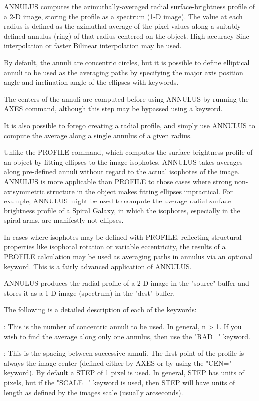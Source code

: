 ANNULUS computes the azimuthally-averaged radial surface-brightness profile
of a 2-D image, storing the profile as a spectrum (1-D image).  The value
at each radius is defined as the azimuthal average of the pixel values
along a suitably defined annulus (ring) of that radius centered on the
object.  High accuracy Sinc interpolation or faster Bilinear interpolation
may be used.

By default, the annuli are concentric circles, but it is possible to define
elliptical annuli to be used as the averaging paths by specifying the major
axis position angle and inclination angle of the ellipses with keywords.

The centers of the annuli are computed before using ANNULUS by running the
AXES command, although this step may be bypassed using a keyword.

It is also possible to forego creating a radial profile, and simply use
ANNULUS to compute the average along a single annulus of a given radius.

Unlike the PROFILE command, which computes the surface brightness profile
of an object by fitting ellipses to the image isophotes, ANNULUS takes
averages along pre-defined annuli without regard to the actual isophotes of
the image.  ANNULUS is more applicable than PROFILE to those cases where
strong non-axisymmetric structure in the object makes fitting ellipses
impractical.  For example, ANNULUS might be used to compute the average
radial surface brightness profile of a Spiral Galaxy, in which the
isophotes, especially in the spiral arms, are manifestly not ellipses.

In cases where isophotes may be defined with PROFILE, reflecting structural
properties like isophotal rotation or variable eccentricity, the results of
a PROFILE calculation may be used as averaging paths in annulus via an
optional keyword.  This is a fairly advanced application of ANNULUS.

ANNULUS produces the radial profile of a 2-D image in the "source"
buffer and stores it as a 1-D image (spectrum) in the "dest" buffer.

The following is a detailed description of each of the keywords:

:\newline
This is the number of concentric annuli to be used.  In general, n > 1.  If
you wish to find the average along only one annulus, then use the "RAD="
keyword.

:\newline
This is the spacing between successive annuli.  The first point of the
profile is always the image center (defined either by AXES or by using the
"CEN=" keyword).  By default a STEP of 1 pixel is used.  In general, STEP
has units of pixels, but if the "SCALE=" keyword is used, then STEP will
have units of length as defined by the images scale (usually arcseconds).

